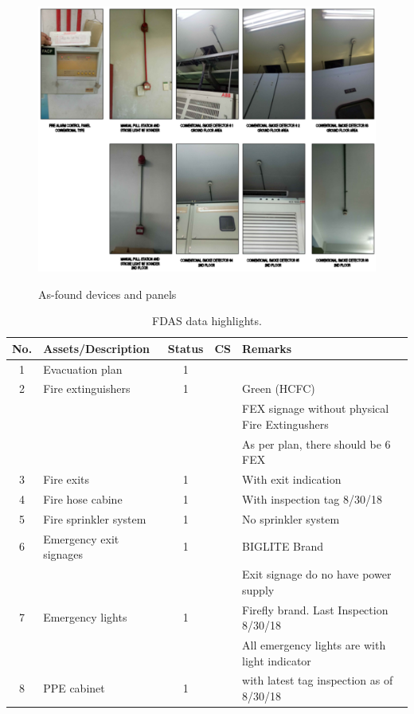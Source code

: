 \begin{figure}[!h]
	\includegraphics[scale=1.7]{figures/ch04_fig_fdas01} \\
	\caption{As-found devices and panels}
	\label{ch04_fig_fdas01} 
\end{figure}



\begin{table}[!h]
	\caption{FDAS data highlights.}
	\label{ch04_fdas011}
	{\footnotesize
		\begin{tabular}{c|p{4cm}|c|c|p{7cm}}
			\hline
			No. & Assets/Description & Status & CS & Remarks  \\ 
			\hline
			1 & Evacuation plan &   1 &  &    \\ 
			2 & Fire extinguishers &   1 &  & Green (HCFC)    \\ 
			&    &  &  & FEX signage without physical Fire Extingushers    \\ 
			&    &  &  & As per plan, there should be 6 FEX   \\ 
			3 & Fire exits   & 1 &  & With exit indication   \\ 
			4 & Fire hose cabine   & 1 &  & With inspection tag 8/30/18   \\ 
			5 & Fire sprinkler system   & 1 &  & No sprinkler system   \\ 
			6 & Emergency exit signages   & 1 &  & BIGLITE Brand   \\ 
			&    &  &  & Exit signage do no have power supply   \\ 
			7 & Emergency lights &   1 &  & Firefly brand. Last Inspection 8/30/18  \\ 
			&    &  &  & All emergency lights are with light indicator   \\ 
			8 & PPE cabinet &   1 &  & with latest tag inspection as of 8/30/18   \\ 
			\hline
		\end{tabular}	
	}
\end{table}


